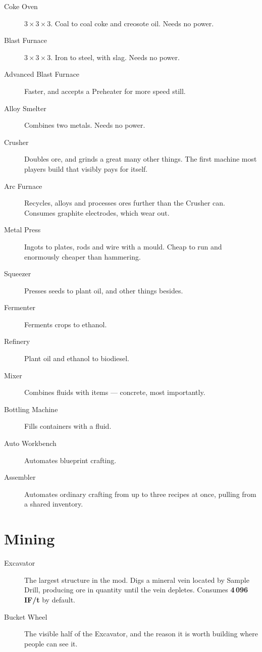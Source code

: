 \begin{description}
\item[Coke Oven] $3\times3\times3$. Coal to coal coke and creosote oil. Needs no power.
\item[Blast Furnace] $3\times3\times3$. Iron to steel, with slag. Needs no power.
\item[Advanced Blast Furnace] Faster, and accepts a Preheater for more speed still.
\item[Alloy Smelter] Combines two metals. Needs no power.
\item[Crusher] Doubles ore, and grinds a great many other things. The first machine most players
      build that visibly pays for itself.
\item[Arc Furnace] Recycles, alloys and processes ores further than the Crusher can. Consumes
      graphite electrodes, which wear out.
\item[Metal Press] Ingots to plates, rods and wire with a mould. Cheap to run and enormously
      cheaper than hammering.
\item[Squeezer] Presses seeds to plant oil, and other things besides.
\item[Fermenter] Ferments crops to ethanol.
\item[Refinery] Plant oil and ethanol to biodiesel.
\item[Mixer] Combines fluids with items --- concrete, most importantly.
\item[Bottling Machine] Fills containers with a fluid.
\item[Auto Workbench] Automates blueprint crafting.
\item[Assembler] Automates ordinary crafting from up to three recipes at once, pulling from a
      shared inventory.
\end{description}

\section{Mining}

\begin{description}
\item[Excavator] The largest structure in the mod. Digs a mineral vein located by Sample Drill,
      producing ore in quantity until the vein depletes. Consumes \textbf{4\,096 IF/t} by default.
\item[Bucket Wheel] The visible half of the Excavator, and the reason it is worth building where
      people can see it.
\end{description}

